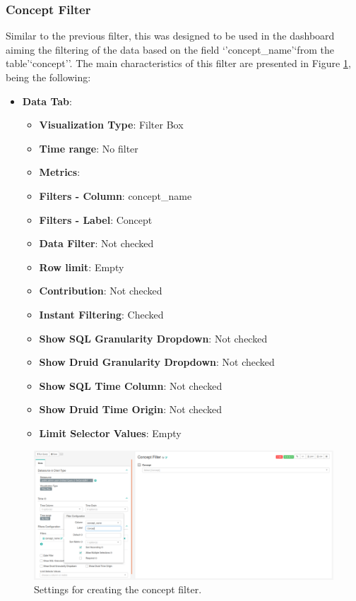 \documentclass[]{book}
\providecommand{\tightlist}{%
  \setlength{\itemsep}{0pt}\setlength{\parskip}{0pt}}
\begin{document}
\subsubsection{Concept Filter}\label{concept-filter}

Similar to the previous filter, this was designed to be used in the
dashboard aiming the filtering of the data based on the field
`'concept\_name'`from the table'`concept''. The main characteristics of
this filter are presented in Figure \ref{fig:conceptFilter}, being the
following:

\begin{itemize}
\tightlist
\item
  \textbf{Data Tab}:

  \begin{itemize}
  \tightlist
  \item
    \textbf{Visualization Type}: Filter Box
  \item
    \textbf{Time range}: No filter
  \item
    \textbf{Metrics}:
  \item
    \textbf{Filters - Column}: concept\_name
  \item
    \textbf{Filters - Label}: Concept
  \item
    \textbf{Data Filter}: Not checked
  \item
    \textbf{Row limit}: Empty
  \item
    \textbf{Contribution}: Not checked
  \item
    \textbf{Instant Filtering}: Checked
  \item
    \textbf{Show SQL Granularity Dropdown}: Not checked
  \item
    \textbf{Show Druid Granularity Dropdown}: Not checked
  \item
    \textbf{Show SQL Time Column}: Not checked
  \item
    \textbf{Show Druid Time Origin}: Not checked
  \item
    \textbf{Limit Selector Values}: Empty
  \end{itemize}
\end{itemize}

\begin{figure}
\includegraphics[width=1\linewidth]{images/conceptFilter} \caption{Settings for creating the concept filter.}\label{fig:conceptFilter}
\end{figure}
\end{document}
